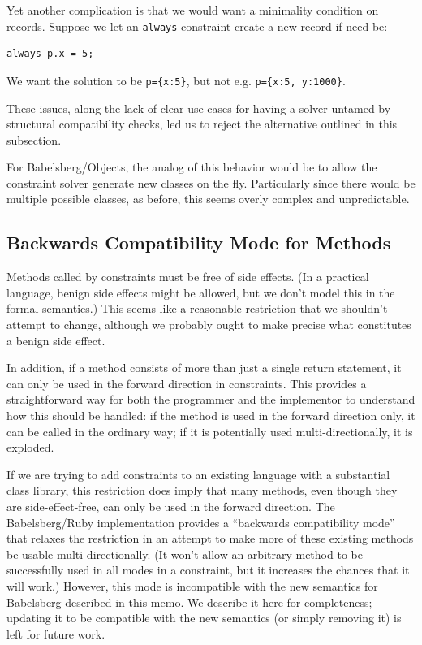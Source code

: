 \documentclass{article}
\begin{document}
Yet another complication is that we would want a minimality condition
on records.  Suppose we let an \verb|always| constraint create a new
record if need be:
\begin{verbatim}
always p.x = 5;
\end{verbatim}
We want the solution to be \verb|p={x:5}|, but not e.g.
\verb|p={x:5, y:1000}|.

These issues, along the lack of clear use cases for having a solver
untamed by structural compatibility checks, led us to reject the
alternative outlined in this subsection.

For Babelsberg/Objects, the analog of this behavior would be to allow
the constraint solver generate new classes on the fly.  Particularly
since there would be multiple possible classes, as before, this seems
overly complex and unpredictable.

\subsection{Backwards Compatibility Mode for Methods}
\label{sec:backwards-compatibility-mode}

Methods called by constraints must be free of side effects.  (In a
practical language, benign side effects might be allowed, but we don't
model this in the formal semantics.)  This seems like a reasonable
restriction that we shouldn't attempt to change, although we probably
ought to make precise what constitutes a benign side effect.

In addition, if a method consists of more than just a single return
statement, it can only be used in the forward direction in
constraints.  This provides a straightforward way for both the
programmer and the implementor to understand how this should be
handled: if the method is used in the forward direction only, it can
be called in the ordinary way; if it is potentially used
multi-directionally, it is exploded.

If we are trying to add constraints to an existing language with a
substantial class library, this restriction does imply that many
methods, even though they are side-effect-free, can only be used in
the forward direction.  The Babelsberg/Ruby implementation provides a
``backwards compatibility mode'' that relaxes the restriction in an
attempt to make more of these existing methods be usable
multi-directionally.  (It won't allow an arbitrary method to be
successfully used in all modes in a constraint, but it increases the
chances that it will work.)  However, this mode is incompatible with
the new semantics for Babelsberg described in this memo.  We describe
it here for completeness; updating it to be compatible with the new
semantics (or simply removing it) is left for future work.
\end{document}
